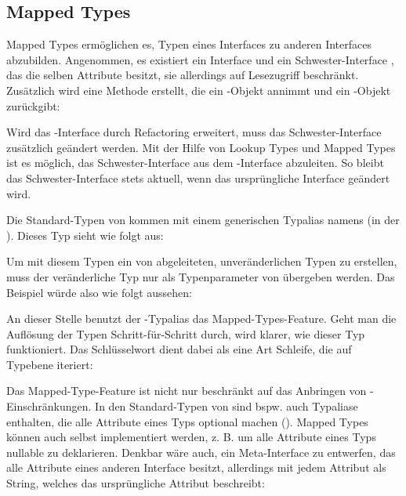 \subsection{Mapped Types}
Mapped Types ermöglichen es, Typen eines Interfaces zu anderen Interfaces abzubilden. Angenommen, es existiert ein Interface   und ein Schwester-Interface , das die selben Attribute besitzt, sie allerdings auf Lesezugriff beschränkt. Zusätzlich wird eine Methode erstellt, die ein -Objekt annimmt und ein -Objekt zurückgibt:


Wird das -Interface durch Refactoring erweitert, muss das Schwester-Interface  zusätzlich geändert werden. Mit der Hilfe von Lookup Types und Mapped Types ist es möglich, das Schwester-Interface aus dem -Interface abzuleiten. So bleibt das Schwester-Interface stets aktuell, wenn das ursprüngliche Interface geändert wird.

Die Standard-Typen von \ts kommen mit einem generischen Typalias namens  (in der ). Dieses Typ sieht wie folgt aus:


Um mit diesem Typen ein von  abgeleiteten, unveränderlichen Typen zu erstellen, muss der veränderliche Typ nur als Typenparameter von  übergeben werden. Das Beispiel würde also wie folgt aussehen:


An dieser Stelle benutzt der -Typalias das Mapped-Types-Feature. Geht man die Auflösung der Typen Schritt-für-Schritt durch, wird klarer, wie dieser Typ funktioniert. Das Schlüsselwort  dient dabei als eine Art Schleife, die auf Typebene iteriert:


Das Mapped-Type-Feature ist nicht nur beschränkt auf das Anbringen von \tsreadonly-Einschränkungen. In den Standard-Typen von \ts sind bspw. auch Typaliase enthalten, die alle Attribute eines Typs optional machen (). Mapped Types können auch selbst implementiert werden, z. B. um alle Attribute eines Typs nullable zu deklarieren. Denkbar wäre auch, ein Meta-Interface zu entwerfen, das alle Attribute eines anderen Interface besitzt, allerdings mit jedem Attribut als String, welches das ursprüngliche Attribut beschreibt:

